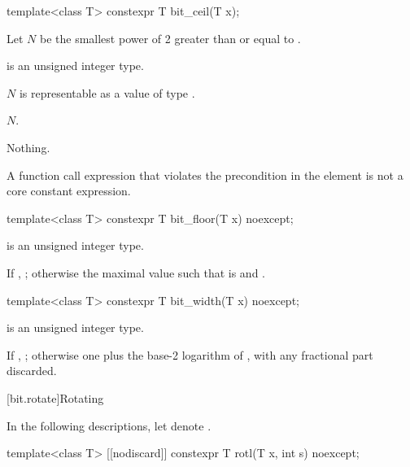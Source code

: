 %
\begin{itemdecl}
template<class T>
  constexpr T bit_ceil(T x);
\end{itemdecl}

\begin{itemdescr}
\pnum
Let $N$ be the smallest power of 2 greater than or equal to .

\pnum
\constraints
{} is an unsigned integer type.

\pnum
\expects
$N$ is representable as a value of type .

\pnum
\returns
$N$.

\pnum
\throws
Nothing.

\pnum
\remarks
A function call expression
that violates the precondition in the \expects element
is not a core constant expression.
\end{itemdescr}

%
\begin{itemdecl}
template<class T>
  constexpr T bit_floor(T x) noexcept;
\end{itemdecl}

\begin{itemdescr}
\pnum
\constraints
{} is an unsigned integer type.

\pnum
\returns
If , ;
otherwise the maximal value 
such that  is  and .
\end{itemdescr}

%
\begin{itemdecl}
template<class T>
  constexpr T bit_width(T x) noexcept;
\end{itemdecl}

\begin{itemdescr}
\pnum
\constraints
{} is an unsigned integer type.

\pnum
\returns
If , ;
otherwise one plus the base-2 logarithm of ,
with any fractional part discarded.
\end{itemdescr}

[bit.rotate]{Rotating}

\pnum
In the following descriptions,
let  denote .

\begin{itemdecl}
template<class T>
  [[nodiscard]] constexpr T rotl(T x, int s) noexcept;
\end{itemdecl}

